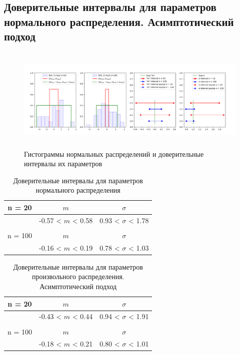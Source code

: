 \subsection{Доверительные интервалы для параметров нормального распределения. Асимптотический подход}
    \begin{figure}[H]
		\centering
		    \includegraphics[width = 15cm, height = 5cm]{part_asymp_normal_estimates/figures/norm_asymp}
		\caption{Гистограммы нормальных распределений и доверительные интервалы их параметров}
		\label{fig:hist_norm_estimates}
	\end{figure}

	\begin{table}[H]
	    \centering
	    \begin{tabular}{| c | c | c |}
	    \hline
	       n = 20   &  $m$  & $\sigma$\\ \hline
	          &  -0.57 < $m$ < 0.58 & 0.93 < $\sigma$ < 1.78 \\ \hline
	         &   &   \\ \hline
	       n = 100   &  $m$  & $\sigma$\\ \hline
	        & -0.16 < $m$ < 0.19 & 0.78 < $\sigma$ < 1.03 \\
	   \hline
	    \end{tabular}
	    \caption{Доверительные интервалы для параметров нормального распределения}
	    \label{tab:interv_simple}
	\end{table}

	\begin{table}[H]
	    \centering
	    \begin{tabular}{| c | c | c |}
	    \hline
	       n = 20   &  $m$  & $\sigma$\\ \hline
	          &  -0.43 < $m$ < 0.44 & 0.94 < $\sigma$ < 1.91 \\ \hline
	         &   &   \\ \hline
	       n = 100   &  $m$  & $\sigma$\\ \hline
	        & -0.18 < $m$ < 0.21 & 0.80 < $\sigma$ < 1.01 \\
	   \hline
	    \end{tabular}
	    \caption{Доверительные интервалы для параметров произвольного распределения. Асимптотический подход}
	    \label{tab:interv_asimpt}
	\end{table}